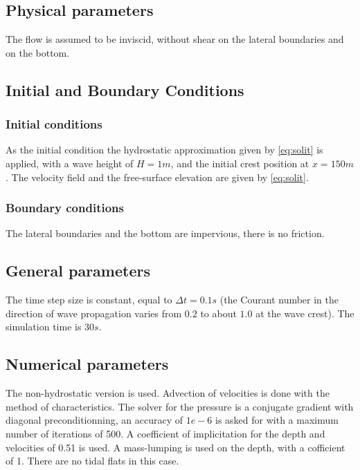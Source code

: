 \subsection{Physical parameters}
%
The flow is assumed to be inviscid, without shear on the lateral boundaries and on the bottom.
%
\subsection{Initial and Boundary Conditions}
%
\subsubsection{Initial conditions}
%
As the initial condition the hydrostatic approximation
given by \eqref{eq:solit} is applied, with a wave height of $H = 1 m$,
and the initial crest position at $x = 150 m$. The velocity field and the free-surface
elevation are given by \eqref{eq:solit}.
%
\subsubsection{Boundary conditions}
%
The lateral boundaries and the bottom are impervious, there is no friction.
%
\subsection{General parameters}
%
The time step size is constant, equal to $\Delta t = 0.1 s$ (the Courant number in the direction
of wave propagation varies from $0.2$ to about $1.0$ at the wave crest).
The simulation time is $30 s$.

\subsection{Numerical parameters}
%
The non-hydrostatic version is used. Advection of velocities is done with the method of characteristics.
The solver for the pressure is a conjugate gradient with diagonal preconditionning,
an accuracy of $1e-6$ is asked for with a maximum number of iterations of 500.
A coefficient of implicitation for the depth and velocities of 0.51 is used.
A mass-lumping is used on the depth, with a cofficient of 1.
There are no tidal flats in this case.
%
